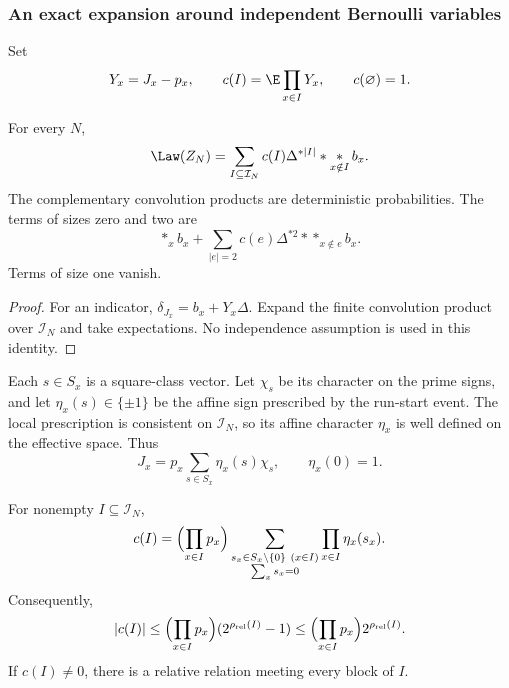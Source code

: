 \subsubsection{An exact expansion around independent Bernoulli variables}

Set
\[
 Y_x=J_x-p_x,\qquad c(I)=\E\prod_{x\in I}Y_x,
 \qquad c(\varnothing)=1.
\]

\begin{proposition}
\label{p1:alg:centred}
For every \(N\),
\begin{equation}
 \Law(Z_N)=\sum_{I\subseteq\mathcal I_N}
       c(I)\Delta^{*|I|}*\mathop{*}_{x\notin I}b_x .
 \label{p1:alg:centred-identity}
\end{equation}
The complementary convolution products are deterministic probabilities.
The terms of sizes zero and two are
\[
 \mathop{*}_{x}b_x+
 \sum_{|e|=2}c(e)\Delta^{*2}*\mathop{*}_{x\notin e}b_x.
\]
Terms of size one vanish.
\end{proposition}

\begin{proof}
For an indicator,
\(\delta_{J_x}=b_x+Y_x\Delta\). Expand the finite convolution
product over \(\mathcal I_N\) and take expectations. No independence
assumption is used in this identity.
\end{proof}

Each \(s\in S_x\) is a square-class vector. Let
\(\chi_s\) be its character on the prime signs, and let
\(\eta_x(s)\in\{\pm1\}\) be the affine sign prescribed by
the run-start event. The local prescription is consistent on
\(\mathcal I_N\), so its affine character \(\eta_x\) is well defined
on the effective space. Thus
\[
 J_x=p_x\sum_{s\in S_x}\eta_x(s)\chi_s,\qquad \eta_x(0)=1.
\]

\begin{lemma}
\label{p1:alg:fourier}
For nonempty \(I\subseteq\mathcal I_N\),
\begin{equation}
 c(I)=\Bigl(\prod_{x\in I}p_x\Bigr)
   \sum_{\substack{s_x\in S_x\setminus\{0\}\ (x\in I)\\
                         \sum_xs_x=0}}
                 \prod_{x\in I}\eta_x(s_x).
 \label{p1:alg:fourier-identity}
\end{equation}
Consequently,
\[
 |c(I)|\le\Bigl(\prod_{x\in I}p_x\Bigr)(2^{\rho_{\mathrm{rel}}(I)}-1)
           \le\Bigl(\prod_{x\in I}p_x\Bigr)2^{\rho_{\mathrm{rel}}(I)}.
\]
If \(c(I)\ne0\), there is a relative relation meeting
every block of \(I\).
\end{lemma}


